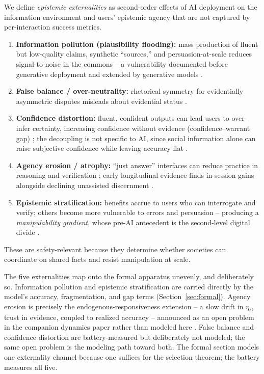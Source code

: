 \documentclass[11pt]{article}
\theoremstyle{definition}
\theoremstyle{remark}
\numberwithin{equation}{section}
\begin{document}
We define \emph{epistemic externalities} as second-order effects of AI deployment on the information environment and users' epistemic agency that are not captured by per-interaction success metrics.
\begin{enumerate}
  \item \textbf{Information pollution (plausibility flooding):} mass production of fluent but low-quality claims, synthetic ``sources,'' and persuasion-at-scale reduces signal-to-noise in the commons -- a vulnerability documented before generative deployment \citep{vosoughi2018spread, lazer2018science} and extended by generative models \citep{goldstein2023generative}.
  \item \textbf{False balance / over-neutrality:} rhetorical symmetry for evidentially asymmetric disputes misleads about evidential status \citep{boykoff2004balance, koehler2016can}.
  \item \textbf{Confidence distortion:} fluent, confident outputs can lead users to over-infer certainty, increasing confidence without evidence (confidence--warrant gap) \citep{alter2009uniting, kidd2023how, zhou2024relying}; the decoupling is not specific to AI, since social information alone can raise subjective confidence while leaving accuracy flat \citep{lorenz2011social}.
  \item \textbf{Agency erosion / atrophy:} ``just answer'' interfaces can reduce practice in reasoning and verification \citep{bainbridge1983ironies, parasuraman1997humans, sparrow2011google, bucinca2021trust, sharma2026whos}; early longitudinal evidence finds in-session gains alongside declining unassisted discernment \citep{rani2026dialogues}.
  \item \textbf{Epistemic stratification:} benefits accrue to users who can interrogate and verify; others become more vulnerable to errors and persuasion -- producing a \emph{manipulability gradient}, whose pre-AI antecedent is the second-level digital divide \citep{hargittai2002second}.
\end{enumerate}
These are safety-relevant because they determine whether societies can coordinate on shared facts and resist manipulation at scale.

The five externalities map onto the formal apparatus unevenly, and deliberately so. Information pollution and epistemic stratification are carried directly by the model's accuracy, fragmentation, and gap terms (Section~\ref{sec:formal}). Agency erosion is precisely the endogenous-responsiveness extension -- a slow drift in $\eta_t$, trust in evidence, coupled to realized accuracy -- announced as an open problem in the companion dynamics paper rather than modeled here \citep{hofheinz2026drift}. False balance and confidence distortion are battery-measured but deliberately not modeled; the same open problem is the modeling path toward both. The formal section models one externality channel because one suffices for the selection theorem; the battery measures all five.
\end{document}
